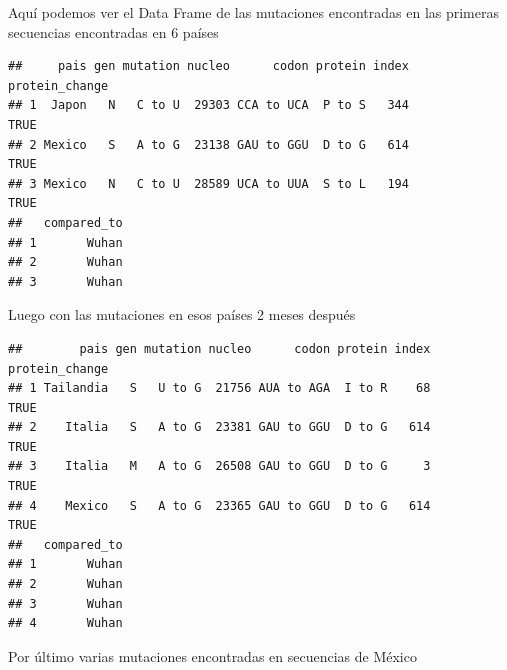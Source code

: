 \documentclass[
  12pt,
]{article}
\begin{document}
Aquí podemos ver el Data Frame de las mutaciones encontradas en las
primeras secuencias encontradas en 6 países

\begin{verbatim}
##     pais gen mutation nucleo      codon protein index protein_change
## 1  Japon   N   C to U  29303 CCA to UCA  P to S   344           TRUE
## 2 Mexico   S   A to G  23138 GAU to GGU  D to G   614           TRUE
## 3 Mexico   N   C to U  28589 UCA to UUA  S to L   194           TRUE
##   compared_to
## 1       Wuhan
## 2       Wuhan
## 3       Wuhan
\end{verbatim}

Luego con las mutaciones en esos países 2 meses después

\begin{verbatim}
##        pais gen mutation nucleo      codon protein index protein_change
## 1 Tailandia   S   U to G  21756 AUA to AGA  I to R    68           TRUE
## 2    Italia   S   A to G  23381 GAU to GGU  D to G   614           TRUE
## 3    Italia   M   A to G  26508 GAU to GGU  D to G     3           TRUE
## 4    Mexico   S   A to G  23365 GAU to GGU  D to G   614           TRUE
##   compared_to
## 1       Wuhan
## 2       Wuhan
## 3       Wuhan
## 4       Wuhan
\end{verbatim}

Por último varias mutaciones encontradas en secuencias de México
\end{document}
